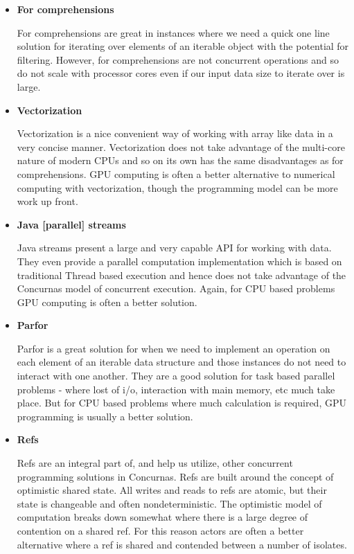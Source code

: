 \documentclass[conc-doc]{subfiles}
\begin{document}
\begin{itemize}
	\item \textbf{For comprehensions}
	
		For comprehensions are great in instances where we need a quick one line solution for iterating over elements of an iterable object with the potential for filtering. However, for comprehensions are not concurrent operations and so do not scale with processor cores even if our input data size to iterate over is large.
		
	\item \textbf{Vectorization}
	
		Vectorization is a nice convenient way of working with array like data in a very concise manner. Vectorization does not take advantage of the multi-core nature of modern CPUs and so on its own has the same disadvantages as for comprehensions. GPU computing is often a better alternative to numerical computing with vectorization, though the programming model can be more work up front.
		
	\item \textbf{Java [parallel] streams}
	
		Java streams present a large and very capable API for working with data. They even provide a parallel computation implementation which is based on traditional Thread based execution and hence does not take advantage of the Concurnas model of concurrent execution. Again, for CPU based problems GPU computing is often a better solution.		
		
	\item \textbf{Parfor}
	
		Parfor is a great solution for when we need to implement an operation on each element of an iterable data structure and those instances do not need to interact with one another. They are a good solution for task based parallel problems - where lost of i/o, interaction with main memory, etc much take place. But for CPU based problems where much calculation is required, GPU programming is usually a better solution.
		
	\item \textbf{Refs}
	
		Refs are an integral part of, and help us utilize, other concurrent programming solutions in Concurnas. Refs are built around the concept of optimistic shared state. All writes and reads to refs are atomic, but their state is changeable and often nondeterministic. The optimistic model of computation breaks down somewhat where there is a large degree of contention on a shared ref. For this reason actors are often a better alternative where a ref is shared and contended between a number of isolates.
		

\end{itemize}
\end{document}
